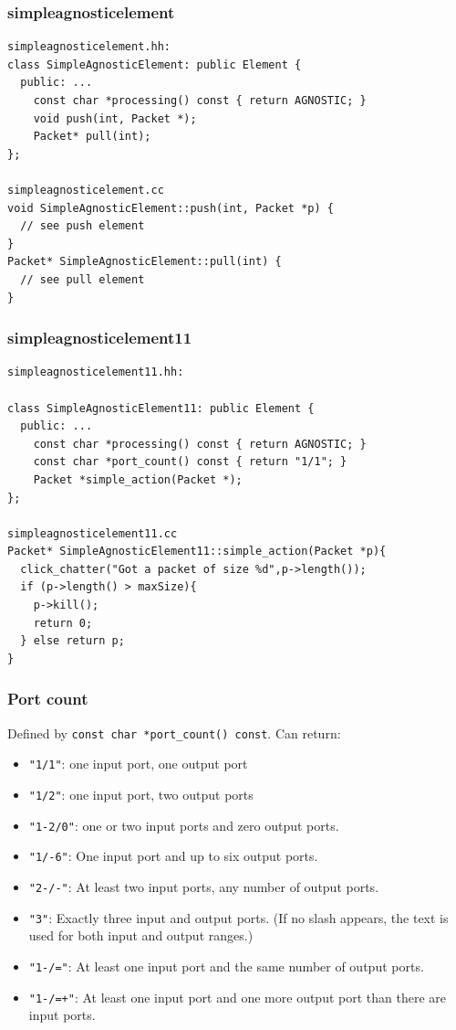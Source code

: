 \documentclass{beamer}
\begin{document}
\begin{frame}[fragile]
\frametitle{simpleagnosticelement}
\begin{lstlisting}[basicstyle=\tiny\ttfamily,emph={AGNOSTIC},emphstyle=\underbar]
simpleagnosticelement.hh:
class SimpleAgnosticElement: public Element { 
  public: ...
    const char *processing() const { return AGNOSTIC; }
    void push(int, Packet *);
    Packet* pull(int);
};

simpleagnosticelement.cc
void SimpleAgnosticElement::push(int, Packet *p) {
  // see push element
}
Packet* SimpleAgnosticElement::pull(int) {
  // see pull element
}
\end{lstlisting}
\end{frame}

\begin{frame}[fragile]
\frametitle{simpleagnosticelement11}
\begin{lstlisting}[basicstyle=\tiny\ttfamily, emph={AGNOSTIC,simple_action},emphstyle=\underbar]
simpleagnosticelement11.hh:

class SimpleAgnosticElement11: public Element { 
  public: ...
    const char *processing() const { return AGNOSTIC; }
    const char *port_count() const { return "1/1"; }
    Packet *simple_action(Packet *);
};

simpleagnosticelement11.cc
Packet* SimpleAgnosticElement11::simple_action(Packet *p){
  click_chatter("Got a packet of size %d",p->length());
  if (p->length() > maxSize){
    p->kill();
    return 0;
  } else return p;
}
\end{lstlisting}
\end{frame}

\begin{frame}[fragile]
\frametitle{Port count}
Defined by \lstinline!const char *port_count() const!. Can return:
\begin{itemize}
	\item \verb!"1/1"!: one input port, one output port
	\item \verb!"1/2"!: one input port, two output ports
	\item \verb!"1-2/0"!: one or two input ports and zero output ports. 
	\item \verb!"1/-6"!: One input port and up to six output ports. 
	\item \verb!"2-/-"!: At least two input ports, any number of output ports. 
	\item \verb!"3"!: Exactly three input and output ports. (If no slash appears, the text is used for both input and output ranges.) 
	\item \verb!"1-/="!: At least one input port and the same number of output ports. 
	\item \verb!"1-/=+"!: At least one input port and one more output port than there are input ports.
\end{itemize}
\end{frame}
\end{document}
